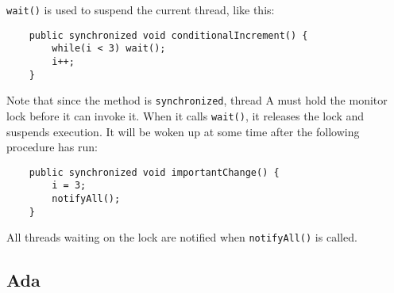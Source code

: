 \texttt{wait()} is used to suspend the current thread, like this:
\begin{verbatim}
    public synchronized void conditionalIncrement() {
        while(i < 3) wait();
        i++;
    }
\end{verbatim}
Note that since the method is \texttt{synchronized}, thread A must hold the monitor lock before it can invoke it. When it calls \texttt{wait()}, it releases the lock and suspends execution. It will be woken up at some time after the following procedure has run:
\begin{verbatim}
    public synchronized void importantChange() {
        i = 3;
        notifyAll();
    }
\end{verbatim} 
All threads waiting on the lock are notified when \texttt{notifyAll()} is called.

\subsection{Ada}

